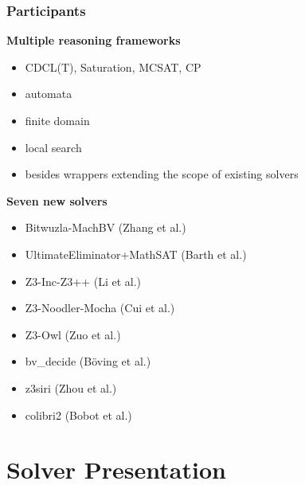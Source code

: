 \documentclass[table]{beamer}
\begin{document}
\begin{frame}
  \frametitle{Participants}

  \textbf{Multiple reasoning frameworks}
  \begin{itemize}
  \item CDCL(T), Saturation, MCSAT, CP
  \item automata
  \item finite domain
  \item local search
  \item besides wrappers extending the scope of existing solvers
  \end{itemize}

  \bigskip
  \textbf{Seven new solvers}
  \begin{itemize}
\item Bitwuzla-MachBV {\footnotesize (Zhang et al.)}
\item UltimateEliminator+MathSAT {\footnotesize (Barth et al.)}
\item Z3-Inc-Z3++ {\footnotesize (Li et al.)}
\item Z3-Noodler-Mocha {\footnotesize (Cui et al.)}
\item Z3-Owl {\footnotesize (Zuo et al.)}
\item bv\_decide {\footnotesize (Böving et al.)}
\item z3siri {\footnotesize (Zhou et al.)}
\item colibri2 {\footnotesize (Bobot et al.)}
\end{itemize}

\end{frame}

\section{Solver Presentation}

\newcommand{\myincludepdf}[1]{
\begin{frame}
  \vspace*{-1pt}%
  \noindent\makebox[\textwidth]{%
    \texttt{[image: \#1]}}
\end{frame}
}
\end{document}
